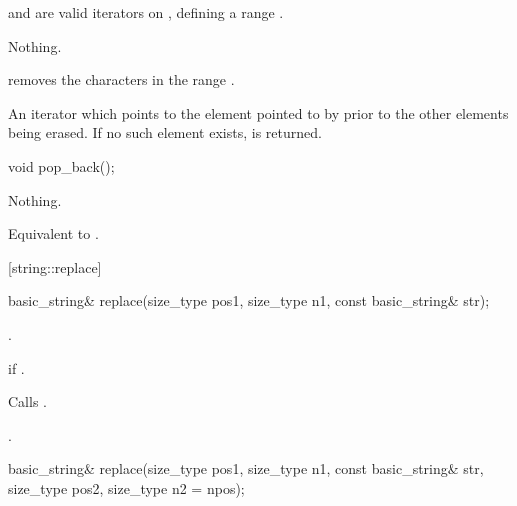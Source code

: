 \begin{itemdescr}
\pnum
\requires
{} and  are valid iterators on
,
defining a range
\tcode{[first,last)}.

\pnum
\throws Nothing.

\pnum
\effects
removes the characters in the range
\tcode{[first,last)}.

\pnum
\returns
An iterator which points to the element pointed to by  prior to
the other elements being erased.
If no such element exists,
is returned.
\end{itemdescr}

%
%
\begin{itemdecl}
void pop_back();
\end{itemdecl}

\begin{itemdescr}
\pnum
\requires
{}

\pnum
\throws Nothing.

\pnum
\effects
Equivalent to .
\end{itemdescr}

[string::replace]{}

%
%
\begin{itemdecl}
basic_string&
  replace(size_type pos1, size_type n1,
          const basic_string& str);
\end{itemdecl}

\begin{itemdescr}
\pnum
\requires {}.

\pnum
\throws {} if .

\pnum
\effects Calls .

\pnum
\returns
{}.
\end{itemdescr}

%
%
\begin{itemdecl}
basic_string&
  replace(size_type pos1, size_type n1,
          const basic_string& str,
          size_type pos2, size_type n2 = npos);
\end{itemdecl}

